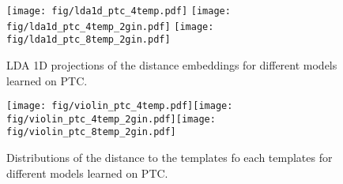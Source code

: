 \documentclass{article}
\begin{document}
{ 
 \begin{figure}[t!]
 	\begin{center}
 		\texttt{[image: fig/lda1d\_ptc\_4temp.pdf]}\hspace{5mm}
 		\texttt{[image: fig/lda1d\_ptc\_4temp\_2gin.pdf]}\hspace{5mm}
 		\texttt{[image: fig/lda1d\_ptc\_8temp\_2gin.pdf]}
 	\end{center}\vspace{-2mm}
 	\caption{LDA 1D projections of the distance embeddings for different
 		models learned on PTC.\label{fig:lda} }
 \end{figure}
 \begin{figure}[t!]
 	\begin{center}
 		\texttt{[image: fig/violin\_ptc\_4temp.pdf]}\texttt{[image: fig/violin\_ptc\_4temp\_2gin.pdf]}\texttt{[image: fig/violin\_ptc\_8temp\_2gin.pdf]}
 	\end{center}\vspace{-2mm}
 	\caption{Distributions of the distance to the templates fo each templates
 		for different models learned on PTC.\label{fig:violin} }
 \end{figure}
 
}
\end{document}

